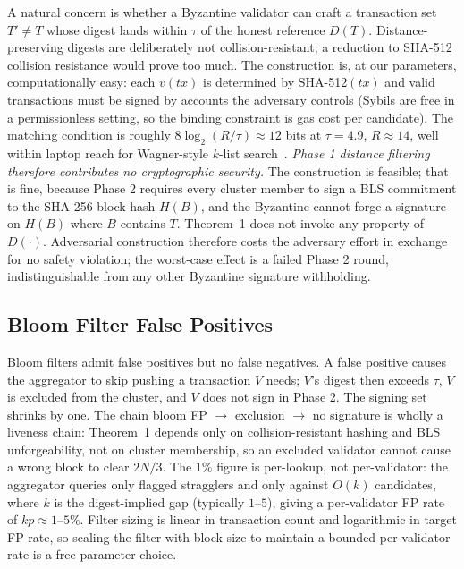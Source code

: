 \documentclass[conference]{IEEEtran}
\begin{document}
A natural concern is whether a Byzantine validator can craft a transaction set $T' \ne T$ whose digest lands within $\tau$ of the honest reference $D(T)$. Distance-preserving digests are deliberately not collision-resistant; a reduction to SHA-512 collision resistance would prove too much. The construction is, at our parameters, computationally easy: each $v(tx)$ is determined by SHA-512$(tx)$ and valid transactions must be signed by accounts the adversary controls (Sybils are free in a permissionless setting, so the binding constraint is gas cost per candidate). The matching condition is roughly $8 \log_2(R/\tau) \approx 12$ bits at $\tau = 4.9$, $R \approx 14$, well within laptop reach for Wagner-style $k$-list search~\cite{wagner2002gbp}. \emph{Phase 1 distance filtering therefore contributes no cryptographic security.} The construction is feasible; that is fine, because Phase 2 requires every cluster member to sign a BLS commitment to the SHA-256 block hash $H(B)$, and the Byzantine cannot forge a signature on $H(B)$ where $B$ contains $T$. Theorem~1 does not invoke any property of $D(\cdot)$. Adversarial construction therefore costs the adversary effort in exchange for no safety violation; the worst-case effect is a failed Phase 2 round, indistinguishable from any other Byzantine signature withholding.

\subsection{Bloom Filter False Positives}
\label{sec:ieee-bloom-fp}

Bloom filters admit false positives but no false negatives. A false positive causes the aggregator to skip pushing a transaction $V$ needs; $V$'s digest then exceeds $\tau$, $V$ is excluded from the cluster, and $V$ does not sign in Phase 2. The signing set shrinks by one. The chain bloom FP $\rightarrow$ exclusion $\rightarrow$ no signature is wholly a liveness chain: Theorem~1 depends only on collision-resistant hashing and BLS unforgeability, not on cluster membership, so an excluded validator cannot cause a wrong block to clear $2N/3$. The $1\%$ figure is per-lookup, not per-validator: the aggregator queries only flagged stragglers and only against $O(k)$ candidates, where $k$ is the digest-implied gap (typically $1$--$5$), giving a per-validator FP rate of $kp \approx 1$--$5\%$. Filter sizing is linear in transaction count and logarithmic in target FP rate, so scaling the filter with block size to maintain a bounded per-validator rate is a free parameter choice.
\end{document}
